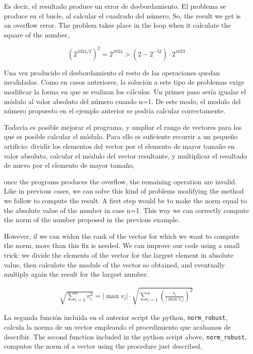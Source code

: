 \begin{paracol}{2}
 Es decir, el resultado produce un error de desbordamiento. El problema se produce en el bucle, al calcular el cuadrado del número,
 \switchcolumn
 So, the result we get is an overflow error. The problem takes place in the loop when it calculate the square of the number,
\end{paracol}
\begin{equation*}
\left(2^{1024/2}\right)^2=2^{1024}> (2-2^{-52})\cdot 2^{1023}
\end{equation*}
\begin{paracol}{2}
Una vez producido el desbordamiento el resto de las operaciones quedan invalidadas. Como en casos anteriores, la solución a este tipo de problemas exige modificar la forma en que se realizan los cálculos. Un primer paso sería igualar el módulo al valor absoluto del número cuando n=1. De este modo, el modulo del número propuesto en el ejemplo anterior se podría calcular correctamente.

Todavía es posible mejorar el programa, y ampliar el rango de vectores para los que es posible calcular el módulo. Para ello es suficiente recurrir a un pequeño artificio: dividir los elementos del vector por el elemento de mayor tamaño en valor absoluto, calcular el módulo del vector resultante, y multiplicar el resultado de nuevo por el elemento de mayor tamaño,

\switchcolumn
once the programs produces the overflow, the remaining operation are invalid. Like in previous cases, we can solve this kind of problems modifying the method we follow to compute the result. A first step would be to make the norm equal to the absolute value of the number in case n=1. This way we can correctly compute the norm of the number proposed in the previous example.

However, if we can widen the rank of the vector for which we want to compute the norm, more than this fix is needed. We can improve our code using a small trick: we divide the elements of the vector for the largest element in absolute value, then calculate the module of the vector so obtained, and eventually multiply again the result for the largest number. 
\end{paracol}
\begin{align*}
\sqrt{\sum_{i=1}^nv_i^2}=\vert\max{v_i}\vert\cdot\sqrt{\sum_{i=1}^n\left(\frac{v_i}{\vert\max{v_i}\vert}\right)^2}
\end{align*}
\begin{paracol}{2}
La segunda función incluida en el anterior script the python, \texttt{norm_robust}, calcula la norma de un vector empleando el procedimiento que acabamos de describir.	
\switchcolumn
The second function included in the python script above, \texttt{norm_robust}, computes the norm of a vector using the procedure just described,
\end{paracol}
